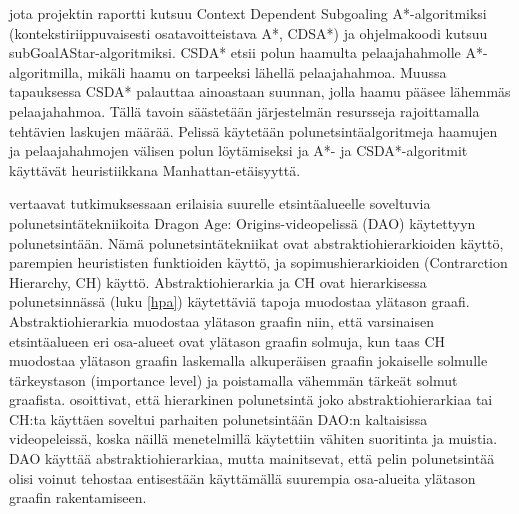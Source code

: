 jota projektin raportti kutsuu Context Dependent Subgoaling A*-algoritmiksi
(kontekstiriippuvaisesti osatavoitteistava A*, CDSA*) ja ohjelmakoodi kutsuu 
subGoalAStar-algoritmiksi. CSDA* etsii polun haamulta pelaajahahmolle 
A*-algoritmilla, mikäli haamu on tarpeeksi lähellä pelaajahahmoa. Muussa 
tapauksessa CSDA* palauttaa ainoastaan suunnan, jolla haamu pääsee lähemmäs 
pelaajahahmoa. Tällä tavoin säästetään järjestelmän resursseja rajoittamalla 
tehtävien laskujen määrää. Pelissä käytetään polunetsintäalgoritmeja 
haamujen ja pelaajahahmojen välisen polun löytämiseksi ja A*- ja 
CSDA*-algoritmit käyttävät heuristiikkana Manhattan-etäisyyttä. \par
	\textcite{SturtevantDAO} vertaavat tutkimuksessaan erilaisia 
suurelle etsintäalueelle soveltuvia polunetsintätekniikoita Dragon Age: 
Origins-videopelissä (DAO) käytettyyn polunetsintään. Nämä 
polunetsintätekniikat ovat abstraktiohierarkioiden käyttö, parempien 
heurististen funktioiden käyttö, ja sopimushierarkioiden (Contrarction 
Hierarchy, CH) käyttö. Abstraktiohierarkia ja CH ovat hierarkisessa 
po\-lun\-etsinnässä (luku \ref{hpa}) käytettäviä tapoja muodostaa ylätason 
graafi. Abstraktiohie\-rar\-kia muodostaa ylätason graafin niin, että 
varsinaisen etsintäalueen eri osa-alueet ovat ylätason graafin solmuja, kun 
taas CH muodostaa ylätason graafin laskemalla alkuperäisen graafin jokaiselle 
solmulle tärkeystason (importance level) ja poistamalla vähemmän tärkeät 
solmut graafista. \textcite{SturtevantDAO} osoittivat, että hierarkinen 
polunetsintä joko abstraktiohierarkiaa tai CH:ta käyttäen soveltui parhaiten 
polunetsintään DAO:n kaltaisissa videopeleissä, koska näillä menetelmillä 
käytettiin vähiten suoritinta ja muistia. DAO käyttää abstraktiohie\-rar\-kiaa, 
mutta \textcite{SturtevantDAO} mainitsevat, että pelin polunetsintää olisi 
voi\-nut tehostaa entisestään käyttämällä suurempia osa-alueita ylätason 
graafin rakentamiseen.

